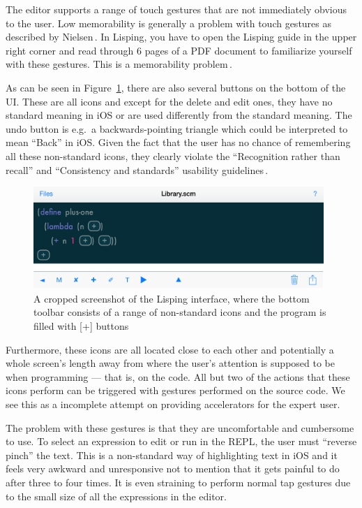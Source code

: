 The editor supports a range of touch gestures that are not immediately obvious to the user. Low memorability is generally a problem with touch gestures as described by Nielsen\,\cite[p. 141]{nielsen2013mobile}. In Lisping, you have to open the Lisping guide in the upper right corner and read through 6 pages of a PDF document to familiarize yourself with these gestures. This is a memorability problem\,\cite{nielsen1990heuristic}.

As can be seen in Figure~\ref{fig:Lisping_screenshot}, there are also several buttons on the bottom of the UI\@. 
These are all icons and except for the delete and edit ones, they have no standard meaning in iOS or are used differently from the standard meaning. 
The undo button is e.g.\ a backwards-pointing triangle which could be interpreted to mean “Back” in iOS\@.
Given the fact that the user has no chance of remembering all these non-standard icons, they clearly violate the ``Recognition rather than recall'' and ``Consistency and standards'' usability guidelines\,\cite{nielsen1990heuristic}. 

\begin{figure}
	\centering
		\includegraphics[width=110mm]{diagrams/Lisping_screenshot.png}
	\caption{A cropped screenshot of the Lisping interface, where the bottom
	toolbar consists of a range of non-standard icons and the program is filled
	with [+] buttons}
\label{fig:Lisping_screenshot}
\end{figure}

Furthermore, these icons are all located close to each other and potentially a whole screen's length away from where the user's attention is supposed to be when programming --- that is, on the code. All but two of the actions that these icons perform can be triggered with gestures performed on the source code. We see this as a incomplete attempt on providing accelerators for the expert user.

The problem with these gestures is that they are uncomfortable and cumbersome to use. To select an expression to edit or run in the REPL, the user must ``reverse pinch'' the text. This is a non-standard way of highlighting text in iOS and it feels very awkward and unresponsive not to mention that it gets painful to do after three to four times. It is even straining to perform normal tap gestures due to the small size of all the expressions in the editor.

